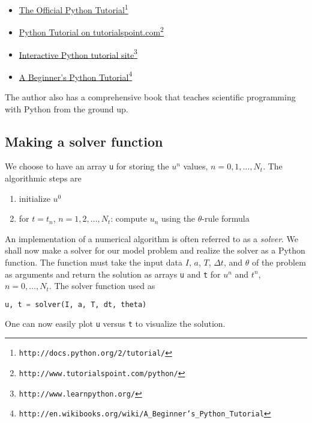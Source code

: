 \documentclass[graybox,sectrefs,envcountresetchap,open=right,final]{svmonodo}
\begin{document}
\begin{itemize}
  \item \href{{http://docs.python.org/2/tutorial/}}{The Official Python Tutorial}\footnote{\texttt{http://docs.python.org/2/tutorial/}}

  \item \href{{http://www.tutorialspoint.com/python/}}{Python Tutorial on tutorialspoint.com}\footnote{\texttt{http://www.tutorialspoint.com/python/}}

  \item \href{{http://www.learnpython.org/}}{Interactive Python tutorial site}\footnote{\texttt{http://www.learnpython.org/}}

  \item \href{{http://en.wikibooks.org/wiki/A_Beginner's_Python_Tutorial}}{A Beginner's Python Tutorial}\footnote{\texttt{http://en.wikibooks.org/wiki/A\_Beginner's\_Python\_Tutorial}}
\end{itemize}

\noindent
The author also has a comprehensive book \cite{Langtangen_2012} that teaches
scientific programming with Python from the ground up.



\subsection{Making a solver function}
\label{decay:py1}

We choose to have an array \texttt{u} for storing the $u^n$ values, $n=0,1,\ldots,N_t$.
The algorithmic steps are

\begin{enumerate}
 \item initialize $u^0$

 \item for $t=t_n$, $n=1,2,\ldots,N_t$: compute $u_n$ using
    the $\theta$-rule formula
\end{enumerate}

\noindent
An implementation of a numerical algorithm is often referred to as
a \emph{solver}. We shall now make a solver for our model problem and
realize the solver as a Python function. The function must take
the input data $I$, $a$, $T$, $\Delta t$, and $\theta$ of the problem
as arguments and return the solution as arrays \texttt{u} and \texttt{t} for
$u^n$ and $t^n$, $n=0,\ldots,N_t$. The solver function used as

\begin{lstlisting}[language=Python,style=blue1_bluegreen]
u, t = solver(I, a, T, dt, theta)
\end{lstlisting}
One can now easily plot \texttt{u} versus \texttt{t} to visualize the solution.
\end{document}
